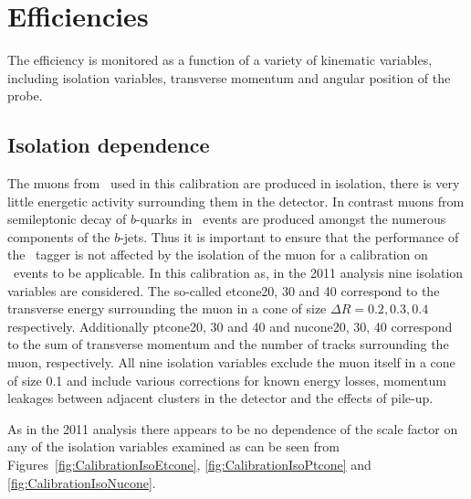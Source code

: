 \section{Efficiencies} \label{sec:CalibrationEfficiencies}

The efficiency is monitored as a function of a variety of kinematic variables, including isolation variables, transverse momentum and angular position of the probe.

\subsection{Isolation dependence} \label{sec:CalibrationEfficienciesIsolation}

The muons from \jpsi\ used in this calibration are produced in isolation, there is very little energetic activity surrounding them in the detector. In contrast muons from semileptonic decay of $b$-quarks in \ttbar\ events are produced amongst the numerous components of the $b$-jets. Thus it is important to ensure that the performance of the \xsm\ tagger is not affected by the isolation of the muon for a calibration on \jpsi\ events to be applicable. In this calibration as, in the 2011 analysis nine isolation variables are considered. The so-called etcone20, 30 and 40 correspond to the transverse energy surrounding the muon in a cone of size $\Delta R=0.2,0.3,0.4$ respectively. Additionally ptcone20, 30 and 40 and nucone20, 30, 40 correspond to the sum of transverse momentum and the number of tracks surrounding the muon, respectively. All nine isolation variables exclude the muon itself in a cone of size 0.1 and include various corrections for known energy losses, momentum leakages between adjacent clusters in the detector and the effects of pile-up.

As in the 2011 analysis there appears to be no dependence of the scale factor on any of the isolation variables examined as can be seen from Figures~\ref{fig:CalibrationIsoEtcone}, \ref{fig:CalibrationIsoPtcone} and \ref{fig:CalibrationIsoNucone}.

